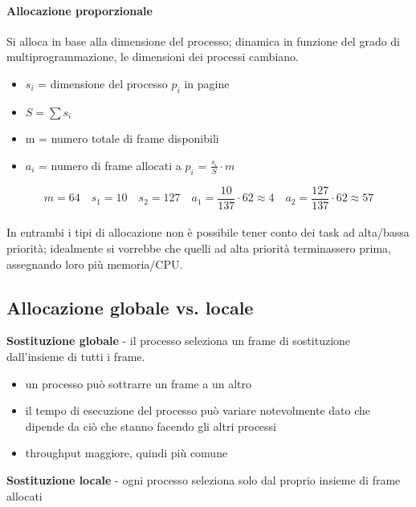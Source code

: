 \paragraph{Allocazione proporzionale}

Si alloca in base alla dimensione del processo; dinamica in funzione del grado di multiprogrammazione, le dimensioni dei processi cambiano.

\begin{itemize}
  \item $s_i$ = dimensione del processo $p_i$ in pagine
  \item $S = \sum{s_i}$
  \item m = numero totale di frame disponibili
  \item $a_i$ = numero di frame allocati a $p_i$ = $\frac{s_i}{S} \cdot m$
\end{itemize}

\begin{equation*}
  m = 64 \quad s_1 = 10 \quad s_2 = 127 \quad a_1 = \frac{10}{137} \cdot 62 \approx 4 \quad a_2 = \frac{127}{137} \cdot 62 \approx 57
\end{equation*}

\paragraph{}


In entrambi i tipi di allocazione non è possibile tener conto dei task ad alta/bassa priorità;
idealmente si vorrebbe che quelli ad alta priorità terminassero prima, assegnando loro più
memoria/CPU.

\subsection{Allocazione globale vs. locale}

\textbf{Sostituzione globale} - il processo seleziona un frame di sostituzione dall'insieme di tutti i frame.

\begin{itemize}
  \item un processo può sottrarre un frame a un altro
  \item il tempo di esecuzione del processo può variare notevolmente dato che dipende da ciò che stanno facendo gli altri processi
  \item throughput maggiore, quindi più comune
\end{itemize}

\textbf{Sostituzione locale} - ogni processo seleziona solo dal proprio insieme di
frame allocati

